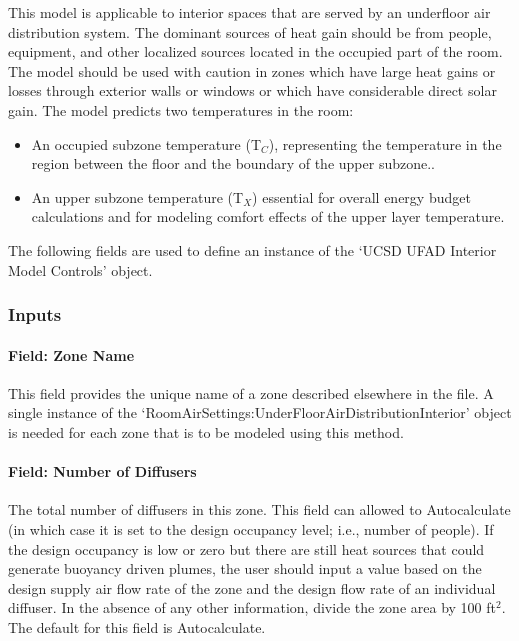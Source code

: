 This model is applicable to interior spaces that are served by an underfloor air distribution system. The dominant sources of heat gain should be from people, equipment, and other localized sources located in the occupied part of the room. The model should be used with caution in zones which have large heat gains or losses through exterior walls or windows or which have considerable direct solar gain. The model predicts two temperatures in the room:

\begin{itemize}
\item
  An occupied subzone temperature (T\(_{C}\)), representing the temperature in the region between the floor and the boundary of the upper subzone..
\item
  An upper subzone temperature (T\(_{X}\)) essential for overall energy budget calculations and for modeling comfort effects of the upper layer temperature.
\end{itemize}

The following fields are used to define an instance of the `UCSD UFAD Interior Model Controls' object.

\subsubsection{Inputs}\label{inputs-10-017}

\paragraph{Field: Zone Name}\label{field-zone-name-6-003}

This field provides the unique name of a zone described elsewhere in the file. A single instance of the `RoomAirSettings:UnderFloorAirDistributionInterior' object is needed for each zone that is to be modeled using this method.

\paragraph{Field: Number of Diffusers}\label{field-number-of-diffusers}

The total number of diffusers in this zone. This field can allowed to Autocalculate (in which case it is set to the design occupancy level; i.e., number of people). If the design occupancy is low or zero but there are still heat sources that could generate buoyancy driven plumes, the user should input a value based on the design supply air flow rate of the zone and the design flow rate of an individual diffuser. In the absence of any other information, divide the zone area by 100 ft\(^{2}\). The default for this field is Autocalculate.

